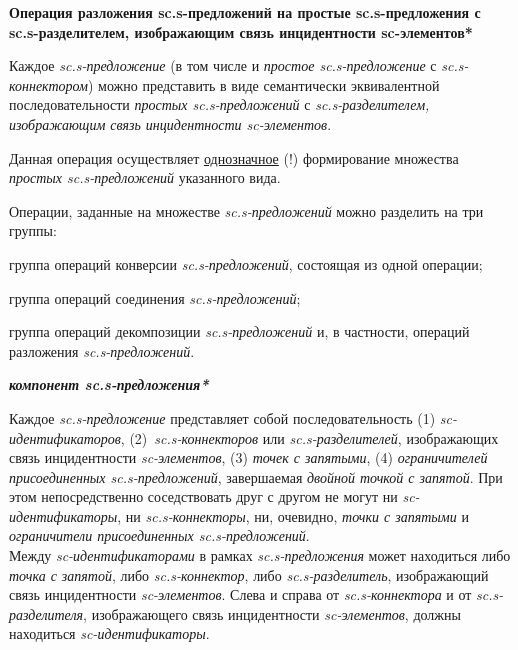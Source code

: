 \begin{textitemize}
	\item \textbf{Операция разложения sc.s-предложений на простые sc.s-предложения с sc.s-разделителем, изображающим связь инцидентности sc-элементов*}
		
		Каждое \textit{sc.s-предложение} (в том числе и \textit{простое sc.s-предложение} с \textit{sc.s-коннектором}) можно представить в виде семантически эквивалентной последовательности \textit{простых \mbox{sc.s-предложений}} с \textit{sc.s-разделителем, изображающим связь инцидентности \mbox{sc-элементов}}.
		
		Данная операция осуществляет \uline{однозначное} (!) формирование множества \textit{простых \mbox{sc.s-предложений}} указанного вида.
\end{textitemize}

Операции, заданные на множестве \textit{sc.s-предложений} можно разделить на три группы:
\begin{textitemize}
	\item группа операций конверсии \textit{sc.s-предложений}, состоящая из одной операции;
	\item группа операций соединения \textit{sc.s-предложений};
	\item группа операций декомпозиции \textit{sc.s-предложений} и, в частности, операций разложения \textit{sc.s-предложений}.
\end{textitemize}

\bigskip
\textbf{\textit{компонент sc.s-предложения*}}

Каждое \textit{sc.s-предложение} представляет собой последовательность (1) \textit{sc-идентификаторов}, \mbox{(2) \textit{sc.s-коннекторов}} или \textit{sc.s-разделителей}, изображающих связь инцидентности \textit{sc-элементов}, (3) \textit{точек с запятыми}, (4) \textit{ограничителей присоединенных sc.s-предложений}, завершаемая \textit{двойной точкой с запятой}. При этом непосредственно соседствовать друг с другом не могут ни \textit{\mbox{sc-идентификаторы}}, ни \textit{\mbox{sc.s-коннекторы}}, ни, очевидно, \textit{точки с запятыми} и \textit{ограничители присоединенных sc.s-предложений}.\\
Между \textit{sc-идентификаторами} в рамках \textit{sc.s-предложения} может находиться либо \textit{точка с запятой}, либо \textit{sc.s-коннектор}, либо \textit{sc.s-разделитель}, изображающий связь инцидентности \textit{sc-элементов}. Слева и справа от \textit{sc.s-коннектора} и от \textit{sc.s-разделителя}, изображающего связь инцидентности \textit{sc-элементов}, должны находиться \textit{sc-идентификаторы}.

